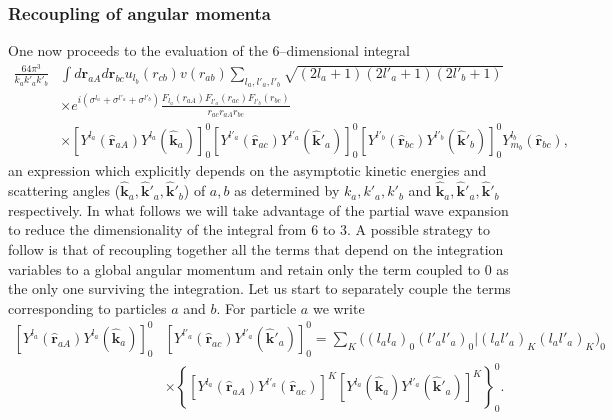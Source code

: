 \begin{subappendices}
\subsubsection{Recoupling of angular momenta}
One now proceeds to the evaluation of the 6--dimensional integral
\begin{equation}\label{eqC6AppF14}
\begin{split}
\frac{64\pi^3}{k_ak'_ak'_b}&\int d\mathbf{r}_{aA}d \mathbf{r}_{bc}u_{l_b}(r_{cb})v(r_{ab})\sum_{l_a,l'_a,l'_b}\sqrt{(2l_a+1)(2l'_a+1)(2l'_b+1)}\\
&\times e^{i(\sigma^{l_a}+\sigma^{l'_a}+\sigma^{l'_b})} \frac{F_{l_a}(r_{aA})  F_{l'_a}(r_{ac})F_{l'_b}(r_{bc})}{r_{ac}r_{aA}r_{bc}}\\
&\times \left[ Y^{l_a} (\hat{\mathbf r}_{aA}) Y^{l_a} (\hat{ \mathbf k}_{a})\right]^0_0\left[ Y^{l'_a} (\hat{\mathbf r}_{ac}) Y^{l'_a} (\hat{ \mathbf k}'_{a})\right]^0_0\left[ Y^{l'_b} (\hat{\mathbf r}_{bc}) Y^{l'_b} (\hat{ \mathbf k}'_{b})\right]^0_0Y^{l_b}_{m_b}(\hat{\mathbf{r}}_{bc}),
\end{split}
\end{equation}
an  expression which explicitly depends  on the asymptotic kinetic energies  and scattering angles  ($\hat{ \mathbf k}_{a},\hat{ \mathbf k}'_{a},\hat{ \mathbf k}'_{b}$) of $a,b$ as determined by $k_a,k'_a,k'_b$ and $\hat{ \mathbf k}_{a},\hat{ \mathbf k}'_{a},\hat{ \mathbf k}'_{b}$ respectively.
In what follows we will take advantage of the partial wave expansion to reduce the dimensionality of the integral from 6 to 3. A possible strategy to follow is that of recoupling together all the terms that depend on the integration variables to a global angular momentum and retain  only the term coupled to 0 as the only one surviving the integration.
Let us start to separately couple  the terms corresponding to particles $a$ and  $b$. For particle $a$ we write
\begin{equation}\label{eqC6AppG10}
\begin{split}
\left[ Y^{l_a} (\hat{\mathbf r}_{aA}) Y^{l_a} (\hat{ \mathbf k}_{a})\right]^0_0 & \left[ Y^{l'_a} (\hat{\mathbf r}_{ac}) Y^{l'_a} (\hat{ \mathbf k}'_{a})\right]^0_0=\sum_K \bigl((l_a l_a)_0(l'_a l'_a)_0|(l_a l'_a)_K(l_a l'_a)_K\bigr)_0\\
& \times \left\{\left[ Y^{l_a} (\hat{\mathbf r}_{aA}) Y^{l'_a} (\hat{ \mathbf r}_{ac})\right]^K \left[Y^{l_a} (\hat{\mathbf k}_{a}) Y^{l'_a} (\hat{ \mathbf k}'_{a})\right]^K\right\}^0_0.
\end{split}
\end{equation}

\end{subappendices}
